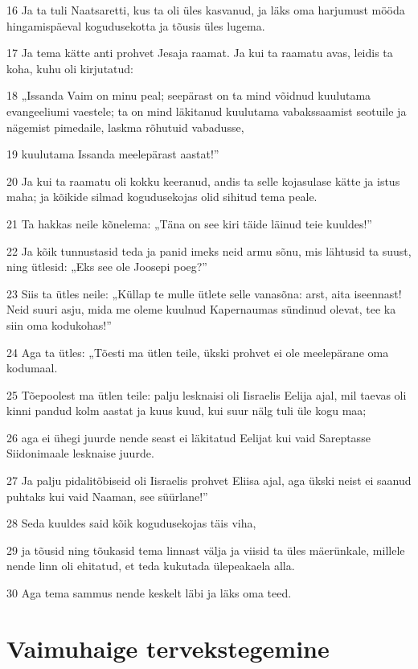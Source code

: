 \par 16 Ja ta tuli Naatsaretti, kus ta oli üles kasvanud, ja läks oma harjumust mööda hingamispäeval kogudusekotta ja tõusis üles lugema.
\par 17 Ja tema kätte anti prohvet Jesaja raamat. Ja kui ta raamatu avas, leidis ta koha, kuhu oli kirjutatud:
\par 18 „Issanda Vaim on minu peal; seepärast on ta mind võidnud kuulutama evangeeliumi vaestele; ta on mind läkitanud kuulutama vabakssaamist seotuile ja nägemist pimedaile, laskma rõhutuid vabadusse,
\par 19 kuulutama Issanda meelepärast aastat!”
\par 20 Ja kui ta raamatu oli kokku keeranud, andis ta selle kojasulase kätte ja istus maha; ja kõikide silmad kogudusekojas olid sihitud tema peale.
\par 21 Ta hakkas neile kõnelema: „Täna on see kiri täide läinud teie kuuldes!”
\par 22 Ja kõik tunnustasid teda ja panid imeks neid armu sõnu, mis lähtusid ta suust, ning ütlesid: „Eks see ole Joosepi poeg?”
\par 23 Siis ta ütles neile: „Küllap te mulle ütlete selle vanasõna: arst, aita iseennast! Neid suuri asju, mida me oleme kuulnud Kapernaumas sündinud olevat, tee ka siin oma kodukohas!”
\par 24 Aga ta ütles: „Tõesti ma ütlen teile, ükski prohvet ei ole meelepärane oma kodumaal.
\par 25 Tõepoolest ma ütlen teile: palju lesknaisi oli Iisraelis Eelija ajal, mil taevas oli kinni pandud kolm aastat ja kuus kuud, kui suur nälg tuli üle kogu maa;
\par 26 aga ei ühegi juurde nende seast ei läkitatud Eelijat kui vaid Sareptasse Siidonimaale lesknaise juurde.
\par 27 Ja palju pidalitõbiseid oli Iisraelis prohvet Eliisa ajal, aga ükski neist ei saanud puhtaks kui vaid Naaman, see süürlane!”
\par 28 Seda kuuldes said kõik kogudusekojas täis viha,
\par 29 ja tõusid ning tõukasid tema linnast välja ja viisid ta üles mäerünkale, millele nende linn oli ehitatud, et teda kukutada ülepeakaela alla.
\par 30 Aga tema sammus nende keskelt läbi ja läks oma teed.

\section*{Vaimuhaige tervekstegemine}

